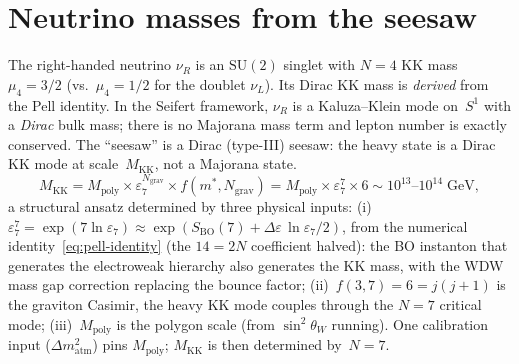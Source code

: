 \section{Neutrino masses from the seesaw}
\label{sec:neutrinos}

The right-handed neutrino $\nu_R$ is an $\mathrm{SU}(2)$ singlet
with $N = 4$ KK mass $\mu_4 = 3/2$
(vs.\ $\mu_4 = 1/2$ for the doublet $\nu_L$).
Its Dirac KK mass is \emph{derived} from the Pell identity.
In the Seifert framework, $\nu_R$ is a Kaluza--Klein mode on~$S^1$
with a \emph{Dirac} bulk mass; there is no Majorana mass term
and lepton number is exactly conserved.
The ``seesaw'' is a Dirac (type-III) seesaw: the heavy state
is a Dirac KK mode at scale~$M_{\mathrm{KK}}$, not a Majorana state.
\begin{equation}\label{eq:M-R}
  M_{\mathrm{KK}} = M_{\mathrm{poly}} \times \varepsilon_7^{N_{\mathrm{grav}}}
  \times f(m^*, N_{\mathrm{grav}})
  = M_{\mathrm{poly}} \times \varepsilon_7^7 \times 6
  \sim 10^{13}\text{--}10^{14}\;\mathrm{GeV},
\end{equation}
a structural ansatz determined by three physical inputs:
(i)~$\varepsilon_7^7 = \exp(7\ln\varepsilon_7)
\approx \exp(S_{\mathrm{BO}}(7) + \Delta\varepsilon\,\ln\varepsilon_7/2)$,
from the numerical identity~\eqref{eq:pell-identity}
(the $14 = 2N$ coefficient halved): the BO instanton
that generates the electroweak hierarchy also generates the
KK mass, with the WDW mass gap correction replacing the
bounce factor;
(ii)~$f(3,7) = 6 = j(j{+}1)$ is the graviton Casimir, the
heavy KK mode couples through the $N = 7$
critical mode;
(iii)~$M_{\mathrm{poly}}$ is the polygon scale (from
$\sin^2\theta_W$ running).
One calibration input ($\Delta m^2_{\mathrm{atm}}$) pins
$M_{\mathrm{poly}}$; $M_{\mathrm{KK}}$ is then determined by~$N = 7$.

